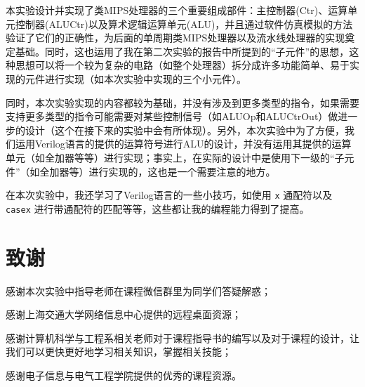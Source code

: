 \documentclass{cumcm}
\numberwithin{equation}{section}
\numberwithin{equation}{subsection}
\begin{document}
本实验设计并实现了类MIPS处理器的三个重要组成部件：主控制器(Ctr)、运算单元控制器(ALUCtr)以及算术逻辑运算单元(ALU)，并且通过软件仿真模拟的方法验证了它们的正确性，为后面的单周期类MIPS处理器以及流水线处理器的实现奠定基础。同时，这也运用了我在第二次实验的报告中所提到的“子元件”的思想，这种思想可以将一个较为复杂的电路（如整个处理器）拆分成许多功能简单、易于实现的元件进行实现（如本次实验中实现的三个小元件）。

同时，本次实验实现的内容都较为基础，并没有涉及到更多类型的指令，如果需要支持更多类型的指令可能需要对某些控制信号（如ALUOp和ALUCtrOut）做进一步的设计（这个在接下来的实验中会有所体现）。另外，本次实验中为了方便，我们运用Verilog语言的提供的运算符号进行ALU的设计，并没有运用其提供的运算单元（如全加器等等）进行实现；事实上，在实际的设计中是使用下一级的“子元件”（如全加器等）进行实现的，这也是一个需要注意的地方。

在本次实验中，我还学习了Verilog语言的一些小技巧，如使用 \texttt{x} 通配符以及 \texttt{casex} 进行带通配符的匹配等等，这些都让我的编程能力得到了提高。

\section{致谢}\label{section6}
感谢本次实验中指导老师在课程微信群里为同学们答疑解惑；

感谢上海交通大学网络信息中心提供的远程桌面资源；

感谢计算机科学与工程系相关老师对于课程指导书的编写以及对于课程的设计，让我们可以更快更好地学习相关知识，掌握相关技能；

感谢电子信息与电气工程学院提供的优秀的课程资源。
%
%
\end{document}

